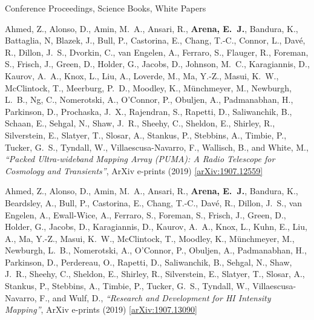 \documentclass{resume} %
\begin{document}
\begin{rSection}{Conference Proceedings, Science Books, White Papers}

\begin{etaremune}

\item {Ahmed}, Z., {Alonso}, D., {Amin}, M.~A.,
         {Ansari}, R., \textbf{{Arena}, E.~J.}, {Bandura}, K.,
         {Battaglia}, N, {Blazek}, J., 
         {Bull}, P., {Castorina}, E.,
         {Chang}, T.-C., {Connor}, L., {Dav{\'e}}, R., {Dillon}, J.~S.,
         {Dvorkin}, C.,
         {van Engelen}, A., {Ferraro}, S., {Flauger}, R.,
         {Foreman}, S., {Frisch}, J., {Green}, D.,
         {Holder}, G., {Jacobs}, D., {Johnson}, M.~C.,
         {Karagiannis}, D.,
         {Kaurov}, A.~A., {Knox}, L., 
         {Liu}, A., {Loverde}, M., {Ma}, Y.-Z., {Masui}, K.~W.,
         {McClintock}, T., {Meerburg}, P.~D., {Moodley}, K.,
         {M{\"u}nchmeyer}, M., {Newburgh}, L.~B., {Ng}, C.,
         {Nomerotski}, A., {O'Connor}, P., {Obuljen}, A.,
         {Padmanabhan}, H., {Parkinson}, D., {Prochaska}, J.~X.,
         {Rajendran}, S.,
         {Rapetti}, D., {Saliwanchik}, B., {Schaan}, E., {Sehgal}, N.,
         {Shaw}, J.~R., {Sheehy}, C., {Sheldon}, E.,
         {Shirley}, R., {Silverstein}, E., {Slatyer}, T.,
         {Slosar}, A., {Stankus}, P., {Stebbins}, A.,
         {Timbie}, P., {Tucker}, G.~S., {Tyndall}, W.,
         {Villaescusa-Navarro}, F., {Wallisch}, B., and {White}, M.,
\textit{``Packed Ultra-wideband Mapping Array (PUMA): A Radio Telescope for Cosmology and Transients''}, ArXiv e-prints (2019) \href{https://arxiv.org/abs/1907.12559}{[arXiv:1907.12559]}

\item {Ahmed}, Z., {Alonso}, D., {Amin}, M.~A.,
         {Ansari}, R., \textbf{{Arena}, E.~J.}, {Bandura}, K.,
         {Beardsley}, A., {Bull}, P., {Castorina}, E.,
         {Chang}, T.-C., {Dav{\'e}}, R., {Dillon}, J.~S.,
         {van Engelen}, A., {Ewall-Wice}, A., {Ferraro}, S.,
         {Foreman}, S., {Frisch}, J., {Green}, D.,
         {Holder}, G., {Jacobs}, D., {Karagiannis}, D.,
         {Kaurov}, A.~A., {Knox}, L., {Kuhn}, E.,
         {Liu}, A., {Ma}, Y.-Z., {Masui}, K.~W.,
         {McClintock}, T., {Moodley}, K.,
         {M{\"u}nchmeyer}, M., {Newburgh}, L.~B.,
         {Nomerotski}, A., {O'Connor}, P., {Obuljen}, A.,
         {Padmanabhan}, H., {Parkinson}, D., {Perdereau}, O.,
         {Rapetti}, D., {Saliwanchik}, B., {Sehgal}, N.,
         {Shaw}, J.~R., {Sheehy}, C., {Sheldon}, E.,
         {Shirley}, R., {Silverstein}, E., {Slatyer}, T.,
         {Slosar}, A., {Stankus}, P., {Stebbins}, A.,
         {Timbie}, P., {Tucker}, G.~S., {Tyndall}, W.,
         {Villaescusa-Navarro}, F., and {Wulf}, D.,
\textit{``Research and Development for HI Intensity Mapping''}, ArXiv e-prints (2019) \href{https://arxiv.org/abs/1907.13090}{[arXiv:1907.13090]}



\end{etaremune}
\end{rSection}
\end{document}
